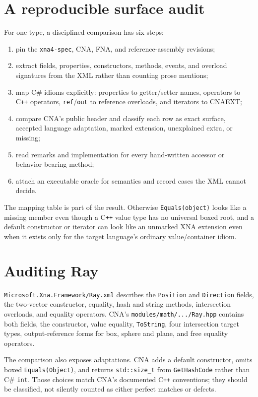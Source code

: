 \section{A reproducible surface audit}

For one type, a disciplined comparison has six steps:

\begin{enumerate}
  \item pin the \texttt{xna4-spec}, CNA, FNA, and reference-assembly revisions;
  \item extract fields, properties, constructors, methods, events, and overload signatures from
        the XML rather than counting prose mentions;
  \item map C\# idioms explicitly: properties to getter/setter names, operators to C\texttt{++}
        operators, \texttt{ref}/\texttt{out} to reference overloads, and iterators to CNAEXT;
  \item compare CNA's public header and classify each row as exact surface, accepted language
        adaptation, marked extension, unexplained extra, or missing;
  \item read remarks and implementation for every hand-written accessor or behavior-bearing
        method;
  \item attach an executable oracle for semantics and record cases the XML cannot decide.
\end{enumerate}

The mapping table is part of the result.  Otherwise \texttt{Equals(object)} looks like a missing
member even though a C\texttt{++} value type has no universal boxed root, and a default constructor
or iterator can look like an unmarked XNA extension even when it exists only for the target
language's ordinary value/container idiom.

\section{Auditing Ray}

\texttt{Microsoft.Xna.Framework/Ray.xml} describes the \texttt{Position} and \texttt{Direction}
fields, the two-vector constructor, equality, hash and string methods, intersection overloads, and
equality operators.  CNA's \texttt{modules/math/.../Ray.hpp} contains both fields, the constructor,
value equality, \texttt{ToString}, four intersection target types, output-reference forms for box,
sphere and plane, and free equality operators.

The comparison also exposes adaptations.  CNA adds a default constructor, omits boxed
\texttt{Equals(Object)}, and returns \texttt{std::size\_t} from \texttt{GetHashCode} rather than
C\# \texttt{int}.  Those choices match CNA's documented C\texttt{++} conventions; they should be
classified, not silently counted as either perfect matches or defects.

